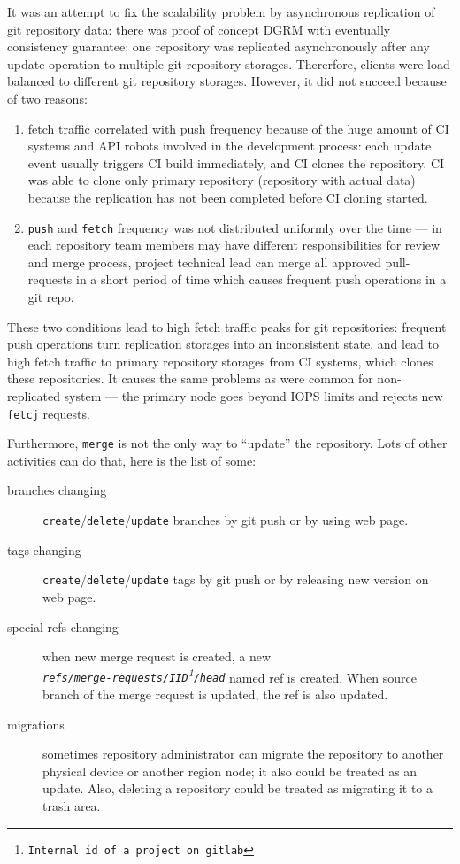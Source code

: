 \documentclass[acmlarge, screen, nonacm]{acmart}
\newcommand{\code}[1]{\texttt{#1}}
\begin{document}
It was an attempt to fix the scalability problem by asynchronous replication of git repository data:
there was proof of concept DGRM with eventually consistency guarantee;
one repository was replicated asynchronously after any update operation to multiple git repository storages. Thererfore,
clients were load balanced to different git repository storages.
However, it did not succeed because of two reasons:
\begin{enumerate}
  \item fetch traffic correlated with push frequency because of the huge amount of
  CI systems and API robots involved in the development process: each update event usually triggers
  CI build immediately, and CI clones the repository. CI was able to clone only
  primary repository (repository with actual data) because the replication has not been completed
  before CI cloning started.
  \item \code{push} and \code{fetch} frequency was not distributed uniformly over the time --- in each
  repository team members may have different responsibilities for review and merge process,
  project technical lead can merge all approved pull-requests in a short period of time
  which causes frequent push operations in a git repo.
\end{enumerate}

These two conditions lead to high fetch traffic peaks for git repositories:
frequent push operations turn replication storages into an inconsistent state,
and lead to high fetch traffic to primary repository storages from CI systems, which clones these repositories.
It causes the same problems as were common for non-replicated system --- the primary node goes beyond IOPS limits and
rejects new \code{fetcj} requests.

Furthermore, \code{merge} is not the only way to ``update'' the repository. Lots of other activities can do that,
here is the list of some:

\begin{description}
  \item[branches changing] \verb|create|/\verb|delete|/\verb|update| branches by git push or by using web page.
  \item[tags changing] \verb|create|/\verb|delete|/\verb|update| tags by git push or by releasing new version on web page.
  \item[special refs changing] when new merge request is created, a new\\
    \emph{\code{refs/merge-requests/IID\footnote{Internal id of a project on gitlab}/head}} named ref
    is created. When source branch of the merge request is updated, the ref is also updated.
  \item[migrations] sometimes repository administrator can migrate the repository to
    another physical device or another region node; it also could be treated as an update.
    Also, deleting a repository could be treated as migrating it to a trash area.
\end{description}
\end{document}
